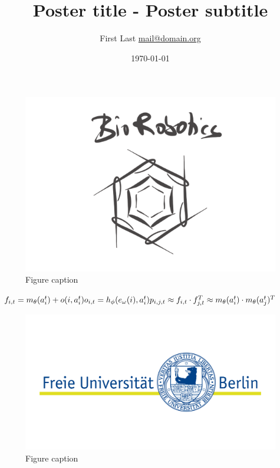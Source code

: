\documentclass[final]{beamer}
\title
[Conference name, 1 - 5 March, Location]
{Poster title - \newline Poster subtitle}
\author{ %
First Last\inst{1} \url{mail@domain.org}
}
\institute
[Freie Universität Berlin]
{
\inst{1} Biorobotics Lab Berlin \url{biorobotics.mi.fu-berlin.de}\\[0.3ex]
}
\date{\today}
\begin{document}
\begin{frame}[t]
\begin{multicols}{3}

\justifying

\begin{figure}
    \begin{mdframed}[backgroundcolor=black!2,userdefinedwidth=\columnwidth,linewidth=0pt]
    \centering
    \includegraphics[width=0.96\columnwidth]{image/biorobotics}
    \caption{\small Figure caption}
    \label{fig:lab_logo}
    \end{mdframed}
\end{figure}

\blindtext[1]

$
f_{i, t}=m_\theta (a_i^t) + o(i, a_i^t) \\
o_{i, t}=h_\phi (e_\omega(i), a_i^t) \\
p_{i, j, t} \approx f_{i, t} \cdot f_{j, t}^T \approx m_\theta (a_i^t) \cdot m_\theta (a_j^t)^T
$

\blindtext[2]

\begin{figure}
    \begin{mdframed}[backgroundcolor=black!2,userdefinedwidth=\columnwidth,linewidth=0pt]
    \centering
    \includegraphics[width=0.96\columnwidth]{image/fuberlin}
    \caption{\small Figure caption}
    \label{fig:lab_logo}
    \end{mdframed}
\end{figure}


\end{multicols}
\end{frame}
\end{document}
